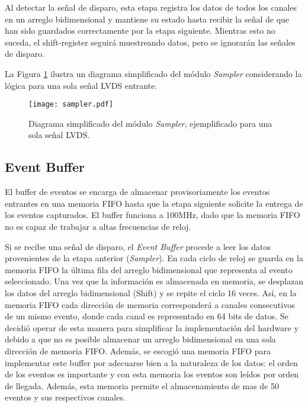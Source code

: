 	Al detectar la señal de disparo, esta etapa registra los datos de todos los canales en un arreglo bidimensional y mantiene su estado hasta recibir la señal de que han sido guardados correctamente por la etapa siguiente. Mientras esto no suceda, el shift-register seguirá muestreando datos, pero se ignorarán las señales de disparo.
	
	La Figura \ref{fig:sampler} ilustra un diagrama simplificado del módulo \textit{Sampler} considerando la lógica para una sola señal LVDS entrante. 
	
	\begin{figure}[H]
		\centering
		\texttt{[image: sampler.pdf]}
		\caption{Diagrama simplificado del módulo \textit{Sampler}, ejemplificado para una sola señal LVDS.}
		\label{fig:sampler}
	\end{figure}
	
	
	\subsection{Event Buffer}
	\label{sec:buffer}
	
	El buffer de eventos se encarga de almacenar provisoriamente los eventos entrantes en una memoria FIFO hasta que la etapa siguiente solicite la entrega de los eventos capturados. El buffer funciona a 100MHz, dado que la memoria FIFO no es capaz de trabajar a altas frecuencias de reloj.
	
	Si se recibe una señal de disparo, el \textit{Event Buffer} procede a leer los datos provenientes de la etapa anterior (\textit{Sampler}). En cada ciclo de reloj se guarda en la memoria FIFO la última fila del arreglo bidimensional que representa al evento seleccionado. Una vez que la información es almacenada en memoria, se desplazan los datos del arreglo bidimensional (Shift) y se repite el ciclo 16 veces. Así, en la memoria FIFO cada dirección de memoria corresponderá a canales consecutivos de un mismo evento, donde cada canal es representado en 64 bits de datos. Se decidió operar de esta manera para simplificar la implementación del hardware y debido a que no es posible almacenar un arreglo bidimensional en una sola dirección de memoria FIFO. Además, se escogió una memoria FIFO para implementar este buffer por adecuarse bien a la naturaleza de los datos: el orden de los eventos es importante y con esta memoria los eventos son leídos por orden de llegada. Además, esta memoria permite el almacenamiento de mas de 50 eventos y sus respectivos canales.
	
